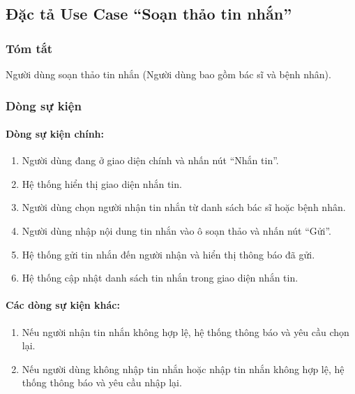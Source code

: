 \subsection{Đặc tả Use Case ``Soạn thảo tin nhắn''}

\subsubsection{Tóm tắt}
Người dùng soạn thảo tin nhắn (Người dùng bao gồm bác sĩ và bệnh nhân).

\subsubsection{Dòng sự kiện}
\paragraph{\textbf{Dòng sự kiện chính:}}
\begin{enumerate}
    \item Người dùng đang ở giao diện chính và nhấn nút ``Nhắn tin''.
    \item Hệ thống hiển thị giao diện nhắn tin.
    \item Người dùng chọn người nhận tin nhắn từ danh sách bác sĩ hoặc bệnh nhân.
    \item Người dùng nhập nội dung tin nhắn vào ô soạn thảo và nhấn nút ``Gửi''.
    \item Hệ thống gửi tin nhắn đến người nhận và hiển thị thông báo đã gửi.
    \item Hệ thống cập nhật danh sách tin nhắn trong giao diện nhắn tin.
\end{enumerate}

\paragraph{\textbf{Các dòng sự kiện khác:}}
\begin{enumerate}
    \item Nếu người nhận tin nhắn không hợp lệ, hệ thống thông báo và yêu cầu chọn lại.
    \item Nếu người dùng không nhập tin nhắn hoặc nhập tin nhắn không hợp lệ, hệ thống thông báo và yêu cầu nhập lại.
\end{enumerate}

